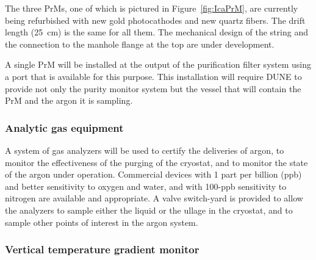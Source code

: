 The three PrMs, one of which is pictured in Figure~\ref{fig:IcaPrM}, are currently being refurbished with new gold photocathodes and new quartz fibers. The drift length  (25~cm) is the same for all them. 
The mechanical  design of the string and the connection to the manhole flange at the top 
are under development.

A single PrM will be installed at the output of the purification filter system using a port that is available for this purpose. This installation will require DUNE to provide not only the purity monitor system but the vessel that will contain the PrM and the argon it is sampling.


\subsubsection{Analytic gas equipment}

A system of gas analyzers will be used to certify the deliveries of argon, to monitor the effectiveness of the purging of the cryostat, and to monitor the state of the argon under operation. Commercial devices with 1 part per billion (ppb) and better sensitivity to oxygen and water, and with 100-ppb sensitivity to nitrogen are available and appropriate. A valve switch-yard is provided to allow the analyzers to sample either the liquid or the ullage in the cryostat, and to sample other points of interest in the argon system.


\subsubsection{Vertical temperature gradient monitor}

